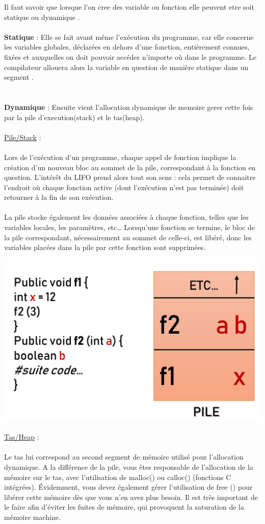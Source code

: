 \documentclass[a4paper,12pt,openany]{book}
\begin{document}
Il faut savoir que lorsque l'on cree des variable ou fonction elle peuvent etre soit statique ou dynamique .\\
\\
\textbf{Statique} :  Elle se fait avant même l’exécution du programme, car elle concerne les variables globales, déclarées en dehors d’une fonction, entièrement connues, fixées et auxquelles on doit pouvoir accéder n’importe où dans le programme. Le compilateur allouera alors la variable en question de manière statique dans un segment .\\
\\
\\
\textbf{Dynamique} : Ensuite vient l'allocation dynamique de memoire gerer cette fois par la pile d'execution(stack) et le tas(heap).\\
\\
\underline{Pile/Stack} : \\
\\ 
Lors de l’exécution d’un programme, chaque appel de fonction implique la création d’un nouveau bloc au sommet de la pile, correspondant à la fonction en question. L’intérêt du LIFO prend alors tout son sens : cela permet de connaitre l'endroit où chaque fonction active (dont l’exécution n’est pas terminée) doit retourner à la fin de son exécution.\\
\\
La pile stocke également les données associées à chaque fonction, telles que les variables locales, les paramètres, etc… Lorsqu’une fonction se termine, le bloc de la pile correspondant, nécessairement au sommet de celle-ci, est libéré, donc les variables placées dans la pile par cette fonction sont supprimées.\\
\\
\includegraphics[width=0.5\linewidth,center]{pile_execution.png}\\
\\
\underline{Tas/Heap} : \\
\\
Le tas lui correspond au second segment de mémoire utilisé pour l’allocation dynamique. A la différence de la pile, vous êtes responsable de l’allocation de la mémoire sur le tas, avec l’utilisation de malloc() ou calloc() (fonctions C intégrées). Évidemment, vous devez également gérer l’utilisation de free () pour libérer cette mémoire dès que vous n’en avez plus besoin. Il est très important de le faire afin d’éviter les fuites de mémoire, qui provoquent la saturation de la mémoire machine.\\
\end{document}
